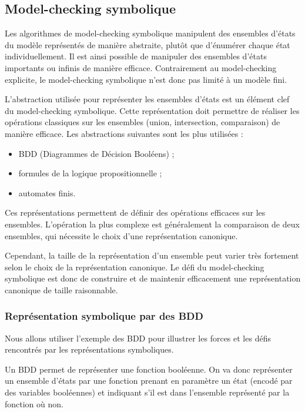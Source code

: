 \subsection{Model-checking symbolique}

Les algorithmes de model-checking symbolique manipulent des ensembles d'états
du modèle représentés de manière abstraite, plutôt que d'énumérer chaque état
individuellement. Il est ainsi possible de manipuler des ensembles
d'états importants ou infinis de manière efficace. Contrairement au
model-checking explicite, le model-checking symbolique n'est donc pas limité à
un modèle fini.

L'abstraction utilisée pour représenter les ensembles d'états est un élément
clef du model-checking symbolique. Cette représentation doit permettre de
réaliser les opérations classiques sur les ensembles (union, intersection,
comparaison) de manière efficace. Les abstractions suivantes sont les plus
utilisées :

\begin{itemize}
\item
  \ac{BDD} (Diagrammes de Décision Booléens) ;
\item
  formules de la logique propositionnelle ;
\item
  automates finis.
\end{itemize}

Ces représentations permettent de définir des opérations efficaces sur les
ensembles. L'opération la plus complexe est généralement la comparaison de deux
ensembles, qui nécessite le choix d'une représentation canonique.

Cependant, la taille de la représentation d'un ensemble peut varier très
fortement selon le choix de la représentation canonique. Le défi du
model-checking symbolique est donc de construire et de maintenir efficacement
une représentation canonique de taille raisonnable.

\subsubsection{Représentation symbolique par des BDD}

Nous allons utiliser l'exemple des \ac{BDD} pour illustrer les forces et les
défis rencontrés par les représentations symboliques.

Un \ac{BDD} permet de représenter une fonction booléenne.
On va donc représenter un ensemble d'états par une fonction prenant
en paramètre un état (encodé par des variables booléennes) et indiquant s’il est dans l'ensemble représenté par la fonction où non.

